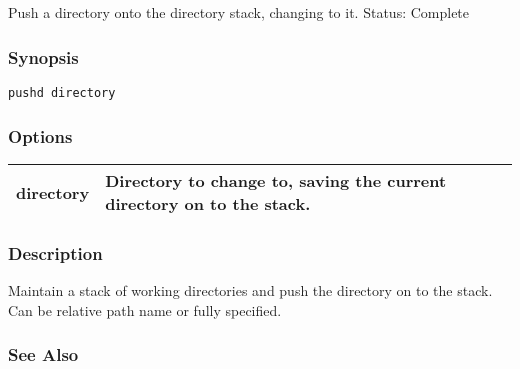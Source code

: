 \subsection{}
\label{pushd}
Push a directory onto the directory stack, changing to it. 
 Status: Complete
\subsubsection*{Synopsis}
\begin{verbatim}
pushd directory
\end{verbatim}
\subsubsection*{Options}
\begin{tabular}{|l|l|}
\hline 
 directory  & Directory to change to, saving the current directory on to the stack.  \\
 \hline 
\end{tabular}
\subsubsection*{Description}
 Maintain a stack of working directories and push the directory on to the stack. Can be relative path name or fully specified. 
\subsubsection*{See Also}
